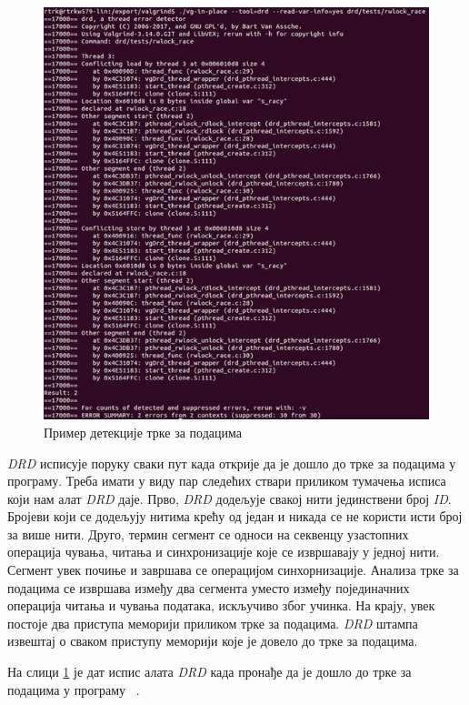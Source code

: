 \documentclass[12pt,oneside]{memoir}
\begin{document}
\begin{figure}[h!]
\begin{center}
\includegraphics[scale=0.75]{slika20.png}
\end{center}
\caption{ Пример детекције трке за подацима}
\label{fig:drd-data-race}
\end{figure}

\indent \textit{DRD} исписује поруку сваки пут када открије да је дошло до трке за подацима у програму. Треба имати у виду пар следећих ствари приликом тумачења исписа који нам алат \textit{DRD} даје. Прво, \textit{DRD} додељује свакој нити јединствени број \textit{ID}. Бројеви који се додељују нитима крећу од један и никада се не користи исти број за више нити. Друго, термин сегмент се односи на секвенцу узастопних операција чувања, читања и синхронизације које се извршавају у једној нити. Сегмент увек почиње и завршава се операцијом синхорнизације. Анализа трке за подацима се извршава између два сегмента уместо између појединачних операција читања и чувања података, искључиво због учинка. На крају, увек постоје два приступа меморији приликом трке за подацима. \textit{DRD} штампа извештај о сваком приступу меморији које је довело до трке за подацима.

\indent На слици \ref{fig:drd-data-race} је дат испис алата \textit{DRD} када пронађе да је дошло до трке за подацима у програму ~\cite{drdRef}.
\end{document}
